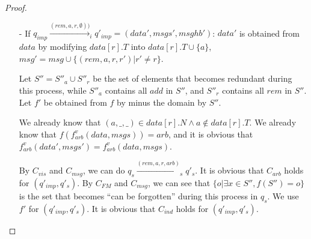\begin {proof}
\begin{itemize}
    It is easy to see that from the perspective of replica $r$ of implementation, $(a,t,p)$ is at the $\mathit{pos}$-th position. %
    It is easy to see that $a$ is previously not in $\mathit{data} \cup \mathit{msg}$, and therefore, $a$ is not in $q_s$. By $C_{\mathit{msg}}$ and $C_{\mathit{vis}}$, we can do $q_s \xrightarrow{( \mathit{add},a,\mathit{pos},r,\mathit{arb}' )}_i q'_s$ and let $o$ be the newly generated operations in $q'_s$, where $\mathit{arb}'$ is chosen to be $f_{\mathit{arb}}^v(\mathit{data}',\mathit{msgs}')$.
    
    It is obvious that no operation become redundant during this process. Let $f' = f \cup \{ ((a,id),,o) \}$. We use $f'$ for $(q'_{\mathit{imp}},q'_s)$. Similarly $C_{\mathit{mhb}}$ holds for $(q'_{\mathit{imp}},q'_s)$. Since there is no remove in $\mathit{FstRem}$ for $o$, and a new $\mathit{add}$ does not influence $\mathit{FstRem}$ for other operations, we have $C_{\mathit{FM}}$ holds for $(q'_{\mathit{imp}},q'_s)$. Since $p$ is in $\mathit{data}[r].N$ or $p = \circ$, $C_{\mathit{rely}}$ holds for $(q'_{\mathit{imp}},q'_s)$. It is easy to see that other condition also hold. Therefore, $(q'_{\mathit{imp}},q'_s) \in R_{\mathit{list}}$.

\item[-] If $q_{\mathit{imp}} \xrightarrow{( \mathit{rem},a,r,\emptyset ))}_i q'_{\mathit{imp}} = (\mathit{data}',\mathit{msgs}',\mathit{msghb}')$: $\mathit{data}'$ is obtained from $\mathit{data}$ by modifying $\mathit{data}[r].T$ into $\mathit{data}[r].T \cup \{ a \}$, $\mathit{msg}' = \mathit{msg} \cup \{ (\mathit{rem},a,r,r') \vert r' \neq r \}$. 

    Let $S'' = S''_a \cup S''_r$ be the set of elements that becomes redundant during this process, while $S''_a$ contains all $\mathit{add}$ in $S''$, and $S''_r$ contains all $\mathit{rem}$ in $S''$. Let $f'$ be obtained from $f$ by minus the domain by $S''$.

    We already know that $(a,\_,\_) \in \mathit{data}[r].N \wedge a \notin \mathit{data}[r].T$. We already know that $f( f_{\mathit{arb}}^v(\mathit{data},\mathit{msgs}) ) = \mathit{arb}$, and it is obvious that $f_{\mathit{arb}}^v(\mathit{data}',\mathit{msgs}') = f_{\mathit{arb}}^v(\mathit{data},\mathit{msgs})$. 
    
    By $C_{\mathit{vis}}$ and $C_{\mathit{msg}}$, we can do $q_s \xrightarrow{( \mathit{rem},a,r,\mathit{arb} )}_s q'_s$. It is obvious that $C_{\mathit{arb}}$ holds for $(q'_{\mathit{imp}},q'_s)$. By $C_{\mathit{FM}}$ and $C_{\mathit{msg}}$, we can see that $\{ o \vert \exists x \in S'', f(S'') = o \}$ is the set that becomes ``can be forgotten'' during this process in $q_s$. We use $f'$ for $(q'_{\mathit{imp}},q'_s)$. It is obvious that $C_{\mathit{ind}}$ holds for $(q'_{\mathit{imp}},q'_s)$. 


\end{itemize}
\end{proof}
